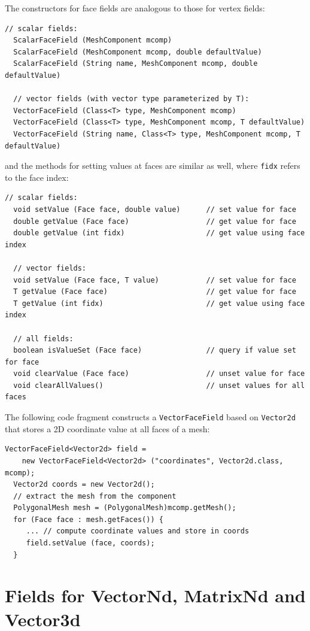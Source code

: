 The constructors for face fields are analogous to those
for vertex fields:
%
\begin{lstlisting}[]
  // scalar fields:
  ScalarFaceField (MeshComponent mcomp)
  ScalarFaceField (MeshComponent mcomp, double defaultValue)
  ScalarFaceField (String name, MeshComponent mcomp, double defaultValue)

  // vector fields (with vector type parameterized by T):
  VectorFaceField (Class<T> type, MeshComponent mcomp)
  VectorFaceField (Class<T> type, MeshComponent mcomp, T defaultValue)
  VectorFaceField (String name, Class<T> type, MeshComponent mcomp, T defaultValue)
\end{lstlisting}
%
and the methods for setting values at faces are similar as
well, where {\tt fidx} refers to the face index:
%
\begin{lstlisting}[]
  // scalar fields:
  void setValue (Face face, double value)      // set value for face
  double getValue (Face face)                  // get value for face
  double getValue (int fidx)                   // get value using face index

  // vector fields:
  void setValue (Face face, T value)           // set value for face
  T getValue (Face face)                       // get value for face
  T getValue (int fidx)                        // get value using face index

  // all fields:
  boolean isValueSet (Face face)               // query if value set for face
  void clearValue (Face face)                  // unset value for face
  void clearAllValues()                        // unset values for all faces
\end{lstlisting}
%

The following code fragment constructs a {\tt VectorFaceField} based
on {\tt Vector2d} that stores a 2D coordinate value at all faces
of a mesh:
%
\begin{lstlisting}[]
  VectorFaceField<Vector2d> field =
    new VectorFaceField<Vector2d> ("coordinates", Vector2d.class, mcomp);
  Vector2d coords = new Vector2d();
  // extract the mesh from the component
  PolygonalMesh mesh = (PolygonalMesh)mcomp.getMesh();
  for (Face face : mesh.getFaces()) {
     ... // compute coordinate values and store in coords
     field.setValue (face, coords);
  }
\end{lstlisting}
%

\section{Fields for VectorNd, MatrixNd and Vector3d}
\label{sec:wrapperFields}

